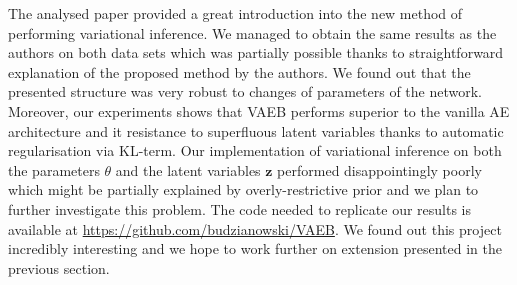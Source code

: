 \documentclass[../report/report.tex]{subfiles}
\begin{document}
The analysed paper provided a great introduction into the new method of performing variational inference. We managed to obtain the same results as the authors on both data sets which was partially possible thanks to straightforward explanation of the proposed method by the authors. We found out that the presented structure was very robust to changes of parameters of the network. Moreover, our experiments shows that VAEB performs superior to the vanilla AE architecture and it resistance to superfluous latent variables thanks to automatic regularisation via KL-term. Our implementation of variational inference on both the parameters $\theta$ and the latent variables $\mathbf{z}$ performed disappointingly poorly which might be partially explained by overly-restrictive prior and we plan to further investigate this problem. The code needed to replicate our results is available at \url{https://github.com/budzianowski/VAEB}. We found out this project incredibly interesting and we hope to work further on extension presented in the previous section.
\end{document}
